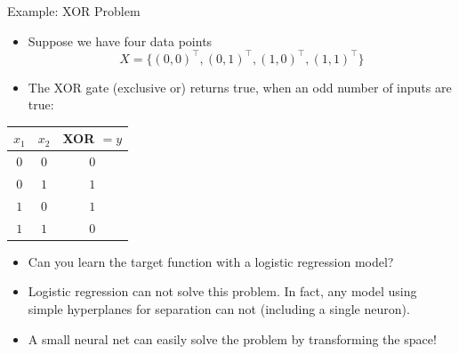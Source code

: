 \documentclass[11pt,compress,t,notes=noshow, xcolor=table]{beamer}
\begin{document}
\begin{vbframe}{Example: XOR Problem}
  \begin{itemize}
    \item Suppose we have four data points $$X = \{(0,0)^\top, (0,1)^\top, (1,0)^\top, (1,1)^\top \}$$
    \item The XOR gate (exclusive or) returns true, when an odd number of inputs are true:
  \end{itemize}
  \begin{table}
    \centering
      \begin{tabular}{ccc}
        \textbf{$x_1$}  & \textbf{$x_2$}  & \textbf{XOR} $= y$ \\
        \hline
        \hline
        $0$             &   $0$           &  $0$ \\
        $0$             &   $1$           &  $1$ \\
        $1$             &   $0$           &  $1$ \\
        $1$             &   $1$           &  $0$
      \end{tabular}
  \end{table}
  \begin{itemize}
    \item Can you learn the target function with a logistic regression model? \\
  \end{itemize}
\framebreak
  \begin{minipage}{0.45\textwidth}
    \begin{itemize}
      \item Logistic regression can not solve this problem. %
      In fact, any model using simple hyperplanes for separation can not (including a single neuron).
      \lz
      \item A small neural net can easily solve the problem by transforming the space!
    \end{itemize}
  \end{minipage}
  \begin{minipage}{0.5\textwidth}

\end{minipage}
\end{vbframe}
\end{document}
